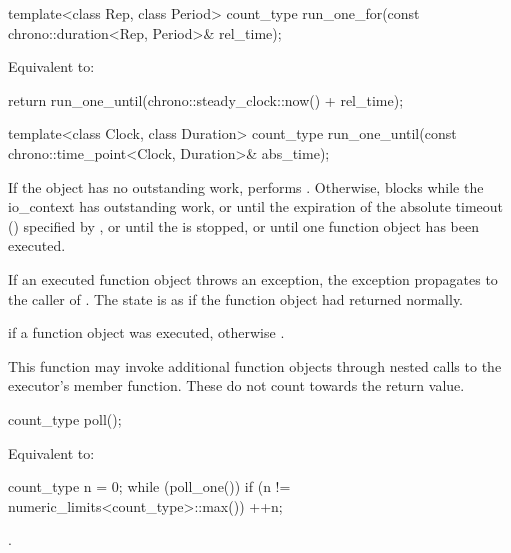 %
\begin{itemdecl}
template<class Rep, class Period>
  count_type run_one_for(const chrono::duration<Rep, Period>& rel_time);
\end{itemdecl}

\begin{itemdescr}
\pnum
\effects Equivalent to:
\begin{codeblock}
return run_one_until(chrono::steady_clock::now() + rel_time);
\end{codeblock}

\end{itemdescr}

%
\begin{itemdecl}
template<class Clock, class Duration>
  count_type run_one_until(const chrono::time_point<Clock, Duration>& abs_time);
\end{itemdecl}

\begin{itemdescr}
\pnum
\effects If the  object has no outstanding work, performs . Otherwise, blocks while the io_context has outstanding work, or until the expiration of the absolute timeout () specified by , or until the  is stopped, or until one function object has been executed.

\pnum
If an executed function object throws an exception, the exception propagates to the caller of . The  state is as if the function object had returned normally.

\pnum
\returns {} if a function object was executed, otherwise .

\pnum
\remarks This function may invoke additional function objects through nested calls to the  executor's  member function. These do not count towards the return value.
\end{itemdescr}

%
\begin{itemdecl}
count_type poll();
\end{itemdecl}

\begin{itemdescr}
\pnum
\effects Equivalent to:
\begin{codeblock}
count_type n = 0;
while (poll_one())
  if (n != numeric_limits<count_type>::max())
    ++n;
\end{codeblock}


\pnum
\returns {}.
\end{itemdescr}

